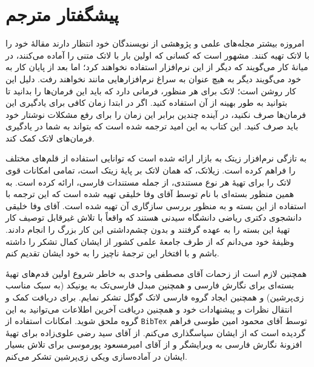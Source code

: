 
\chapter{پیشگفتار مترجم}
امروزه بیشتر مجله‌های علمی و پژوهشی از نویسندگان خود انتظار دارند مقالهٔ خود را با لاتک تهیه کنند. مشهور است که کسانی که اولین بار با لاتک متنی را آماده می‌کنند، در میانهٔ کار می‌گویند که دیگر از این نرم‌افزار استفاده نخواهند کرد؛ اما بعد از پایان کار به خود می‌گویند دیگر به هیچ عنوان به سراغ نرم‌افزارهایی مانند  نخواهند رفت. دلیل این کار روشن است؛ لاتک برای هر منظور، فرمانی دارد که باید این فرمان‌ها را بدانید تا بتوانید به طور بهینه از آن استفاده کنید. اگر در ابتدا زمان کافی برای یادگیری این فرمان‌ها صرف نکنید، در آینده چندین برابر این زمان را برای رفع مشکلات نوشتار خود باید صرف کنید. این کتاب به این امید ترجمه شده است که بتواند به شما در یادگیری فرمان‌های لاتک کمک کند.

به تازگی نرم‌افزار زیتک به بازار ارائه شده است که توانایی استفاده از قلم‌های مختلف را فراهم کرده است. زیلاتک، که همان لاتک بر پایهٔ زیتک است، تمامی امکانات قوی لاتک را برای تهیهٔ هر نوع مستندی، از جمله مستندات فارسی، ارائه کرده است. به همین منظور بسته‌ای با نام \lr{\XePersian} توسط آقای وفا خلیقی تهیه شده است که این ترجمه با استفاده از این بسته و به منظور بررسی سازگاری آن تهیه شده است. آقای وفا خلیقی دانشجوی دکتری ریاضی دانشگاه سیدنی هستند که واقعاً با تلاش غیرقابل توصیف کار تهیهٔ این بسته را به عهده گرفتند و بدون چشم‌داشتی این کار بزرگ را انجام دادند. وظیفهٔ خود می‌دانم که از طرف جامعهٔ علمی کشور از ایشان کمال تشکر را داشته باشم و با افتخار این ترجمهٔ ناچیز را به خود ایشان تقدیم کنم. 

همچنین لازم است از زحمات آقای مصطفی واحدی به خاطر شروع اولین قدم‌های تهیهٔ بسته‌ای برای نگارش فارسی و همچنین مبدل فارسی‌تک به یونیکد (به سبک مناسب زی‌پرشین) و همچنین ایجاد گروه فارسی لاتک گوگل%
تشکر نمایم.  برای دریافت کمک و انتقال نظرات و پیشنهادات خود و همچنین دریافت آخرین اطلاعات می‌توانید به این گروه ملحق شوید. امکانات استفاده از \texttt{BibTex} توسط آقای محمود امین طوسی فراهم گردیده است که از ایشان سپاسگذاری می‌کنم. از آقای سید رضی علوی‌زاده برای تهیهٔ افزونهٔ نگارش فارسی به ویرایشگر  و از آقای امیرمسعود پورموسی برای تلاش بسیار ایشان در آماده‌سازی ویکی زی‌پرشین%
تشکر می‌کنم.
\begin{latin}
\end{latin}